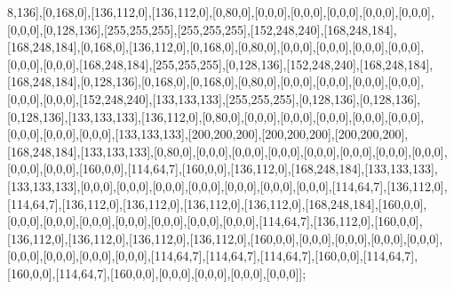 8,136],[0,168,0],[136,112,0],[136,112,0],[0,80,0],[0,0,0],[0,0,0],[0,0,0],[0,0,0],[0,0,0],[0,0,0],[0,128,136],[255,255,255],[255,255,255],[152,248,240],[168,248,184],[168,248,184],[0,168,0],[136,112,0],[0,168,0],[0,80,0],[0,0,0],[0,0,0],[0,0,0],[0,0,0],[0,0,0],[0,0,0],[168,248,184],[255,255,255],[0,128,136],[152,248,240],[168,248,184],[168,248,184],[0,128,136],[0,168,0],[0,168,0],[0,80,0],[0,0,0],[0,0,0],[0,0,0],[0,0,0],[0,0,0],[0,0,0],[152,248,240],[133,133,133],[255,255,255],[0,128,136],[0,128,136],[0,128,136],[133,133,133],[136,112,0],[0,80,0],[0,0,0],[0,0,0],[0,0,0],[0,0,0],[0,0,0],[0,0,0],[0,0,0],[0,0,0],[133,133,133],[200,200,200],[200,200,200],[200,200,200],[168,248,184],[133,133,133],[0,80,0],[0,0,0],[0,0,0],[0,0,0],[0,0,0],[0,0,0],[0,0,0],[0,0,0],[0,0,0],[0,0,0],[160,0,0],[114,64,7],[160,0,0],[136,112,0],[168,248,184],[133,133,133],[133,133,133],[0,0,0],[0,0,0],[0,0,0],[0,0,0],[0,0,0],[0,0,0],[0,0,0],[114,64,7],[136,112,0],[114,64,7],[136,112,0],[136,112,0],[136,112,0],[136,112,0],[168,248,184],[160,0,0],[0,0,0],[0,0,0],[0,0,0],[0,0,0],[0,0,0],[0,0,0],[0,0,0],[114,64,7],[136,112,0],[160,0,0],[136,112,0],[136,112,0],[136,112,0],[136,112,0],[160,0,0],[0,0,0],[0,0,0],[0,0,0],[0,0,0],[0,0,0],[0,0,0],[0,0,0],[0,0,0],[114,64,7],[114,64,7],[114,64,7],[160,0,0],[114,64,7],[160,0,0],[114,64,7],[160,0,0],[0,0,0],[0,0,0],[0,0,0],[0,0,0]];

